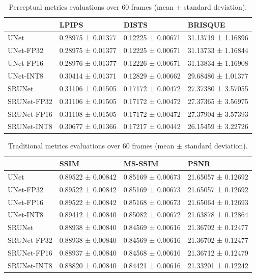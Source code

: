 \begin{table}[t]
\begin{tabular}{llll}
\toprule
{} &              LPIPS &              DISTS &             BRISQUE \\
\midrule
UNet        &  0.28975 ± 0.01377 &  0.12225 ± 0.00671 &  31.13719 ± 1.16896 \\
UNet-FP32   &  0.28975 ± 0.01377 &  0.12225 ± 0.00671 &  31.13733 ± 1.16844 \\
UNet-FP16   &  0.28976 ± 0.01377 &  0.12226 ± 0.00671 &  31.13834 ± 1.16908 \\
UNet-INT8   &  0.30414 ± 0.01371 &  0.12829 ± 0.00662 &  29.68486 ± 1.01377 \\
SRUNet      &  0.31106 ± 0.01505 &  0.17172 ± 0.00472 &  27.37380 ± 3.57055 \\
SRUNet-FP32 &  0.31106 ± 0.01505 &  0.17172 ± 0.00472 &  27.37365 ± 3.56975 \\
SRUNet-FP16 &  0.31108 ± 0.01505 &  0.17172 ± 0.00472 &  27.37904 ± 3.57393 \\
SRUNet-INT8 &  0.30677 ± 0.01366 &  0.17217 ± 0.00442 &  26.15459 ± 3.22726 \\
\bottomrule
\end{tabular}
\caption{Perceptual metrics evaluations over 60 frames (mean $\pm$ standard deviation).}
\label{tab:metrics}
\end{table}

\begin{table}[t]
\begin{tabular}{llll}
\toprule
{} &               SSIM &            MS-SSIM &                PSNR \\
\midrule
UNet        &  0.89522 ± 0.00842 &  0.85169 ± 0.00673 &  21.65057 ± 0.12692 \\
UNet-FP32   &  0.89522 ± 0.00842 &  0.85169 ± 0.00673 &  21.65057 ± 0.12692 \\
UNet-FP16   &  0.89522 ± 0.00842 &  0.85168 ± 0.00673 &  21.65064 ± 0.12693 \\
UNet-INT8   &  0.89412 ± 0.00840 &  0.85082 ± 0.00672 &  21.63878 ± 0.12864 \\
SRUNet      &  0.88938 ± 0.00840 &  0.84569 ± 0.00616 &  21.36702 ± 0.12477 \\
SRUNet-FP32 &  0.88938 ± 0.00840 &  0.84569 ± 0.00616 &  21.36702 ± 0.12477 \\
SRUNet-FP16 &  0.88937 ± 0.00840 &  0.84568 ± 0.00616 &  21.36712 ± 0.12479 \\
SRUNet-INT8 &  0.88820 ± 0.00840 &  0.84421 ± 0.00616 &  21.33201 ± 0.12242 \\
\bottomrule
\end{tabular}
\caption{Traditional metrics evaluations over 60 frames (mean $\pm$ standard deviation).}
\label{tab:metrics}
\end{table}

